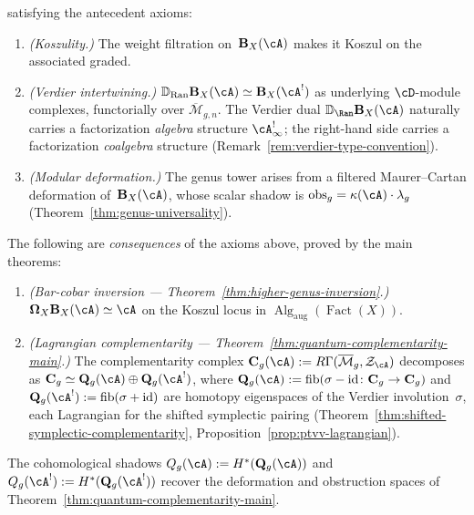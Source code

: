 \begin{definition}
\noindent satisfying the antecedent axioms:
\begin{enumerate}[label=\textup{(MK\arabic*$_\infty$)}]
\item\label{MK:koszul-htpy}
\emph{(Koszulity.)}
The weight filtration on~$\mathbf{B}_X(\cA)$ makes it Koszul on
the associated graded.

\item\label{MK:verdier-htpy}
\emph{(Verdier intertwining.)}
$\mathbb{D}_{\operatorname{Ran}} \mathbf{B}_X(\cA) \simeq
\mathbf{B}_X(\cA^!)$
as underlying $\cD$-module complexes, functorially over
$\overline{\mathcal{M}}_{g,n}$.
The Verdier dual $\mathbb{D}_{\Ran}\mathbf{B}_X(\cA)$ naturally
carries a factorization \emph{algebra} structure
$\cA^!_\infty$; the right-hand side carries a factorization
\emph{coalgebra} structure
(Remark~\ref{rem:verdier-type-convention}).

\item\label{MK:modular-htpy}
\emph{(Modular deformation.)}
The genus tower arises from a filtered Maurer--Cartan deformation
of~$\mathbf{B}_X(\cA)$, whose scalar shadow is
$\mathrm{obs}_g = \kappa(\cA) \cdot \lambda_g$
\textup{(}Theorem~\textup{\ref{thm:genus-universality})}.
\end{enumerate}

\noindent The following are \emph{consequences} of the axioms above,
proved by the main theorems:
\begin{enumerate}[label=\textup{(MK\arabic*$_\infty$)},start=4]
\item\label{MK:inversion-htpy}
\emph{(Bar-cobar inversion --- Theorem~\textup{\ref{thm:higher-genus-inversion}}.)}
$\boldsymbol{\Omega}_X \mathbf{B}_X(\cA) \simeq \cA$
on the Koszul locus in
$\operatorname{Alg}_{\mathrm{aug}}(\operatorname{Fact}(X))$.

\item\label{MK:complementarity-htpy}
\emph{(Lagrangian complementarity --- Theorem~\textup{\ref{thm:quantum-complementarity-main}}.)}
The complementarity complex
$\mathbf{C}_g(\cA) := R\Gamma(\overline{\mathcal{M}}_g, \mathcal{Z}_{\cA})$
decomposes as
$\mathbf{C}_g \simeq \mathbf{Q}_g(\cA) \oplus \mathbf{Q}_g(\cA^!)$,
where $\mathbf{Q}_g(\cA) := \operatorname{fib}(\sigma - \mathrm{id}
\colon \mathbf{C}_g \to \mathbf{C}_g)$ and
$\mathbf{Q}_g(\cA^!) := \operatorname{fib}(\sigma + \mathrm{id})$
are homotopy eigenspaces of the Verdier involution~$\sigma$, each
Lagrangian for the shifted symplectic pairing
\textup{(}Theorem~\textup{\ref{thm:shifted-symplectic-complementarity},}
Proposition~\textup{\ref{prop:ptvv-lagrangian})}.
\end{enumerate}
The cohomological shadows
$Q_g(\cA) := H^*(\mathbf{Q}_g(\cA))$ and
$Q_g(\cA^!) := H^*(\mathbf{Q}_g(\cA^!))$ recover the
deformation and obstruction spaces of
Theorem~\ref{thm:quantum-complementarity-main}.
\end{definition}

